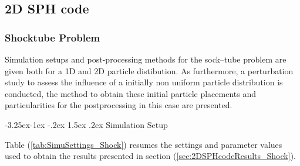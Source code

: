 \documentclass{report}
\makeatletter
\renewcommand\paragraph{\@startsection{paragraph}{4}{\z@}%
  {-3.25ex\@plus -1ex \@minus -.2ex}%
  {1.5ex \@plus .2ex}%
  {\normalfont\normalsize\bfseries}}
\makeatother
\begin{document}


\subsection{2D SPH code}

\subsubsection{Shocktube Problem}
\label{sec:2Dshock_simuSetup&Co}
Simulation setups and post-processing methods for the sock--tube problem are given both for a 1D and 2D particle distibution. As furthermore, a perturbation study to assess the influence of a initially non uniform particle distribution is conducted, the method to obtain these initial particle placements and particularities for the postprocessing in this case are presented. 

\paragraph{Simulation Setup}

Table (\ref{tab:SimuSettings_Shock}) resumes the settings and parameter values used to obtain the results presented in section (\ref{sec:2DSPHcodeResults_Shock}). 
\end{document}
